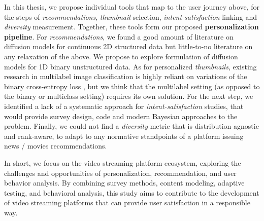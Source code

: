 


In this thesis, we propose individual tools that map to the user journey above, for the steps of \emph{recommendations}, \emph{thumbnail} selection, \emph{intent-satisfaction} linking and \emph{diversity} measurement. Together, these tools form our proposed \textbf{personalization pipeline}. For \emph{recommendations}, we found a good amount of literature on diffusion models \cite{} for continuous 2D structured data but little-to-no literature on any relaxation of the above. We propose to explore formulation of diffusion models for 1D binary unstructured data. As for personalized \emph{thumbnails}, existing research in multilabel image classification is highly reliant on variations of the binary cross-entropy loss \cite{}, but we think that the multilabel setting (as opposed to the binary or multiclass setting) requires its own solution. For the next step, we identified a lack of a systematic approach for \emph{intent-satisfaction} studies, that would provide survey design, code and modern Bayesian approaches to the problem. Finally, we could not find a \emph{diversity} metric that is distribution agnostic and rank-aware, to adapt to any normative standpoints of a platform issuing news / movies recommendations.





In short, we focus on the video streaming platform ecosystem, exploring the challenges and opportunities of personalization, recommendation, and user behavior analysis. By combining survey methods, content modeling, adaptive testing, and behavioral analysis, this study aims to contribute to the development of video streaming platforms that can provide user satisfaction in a responsible way.


